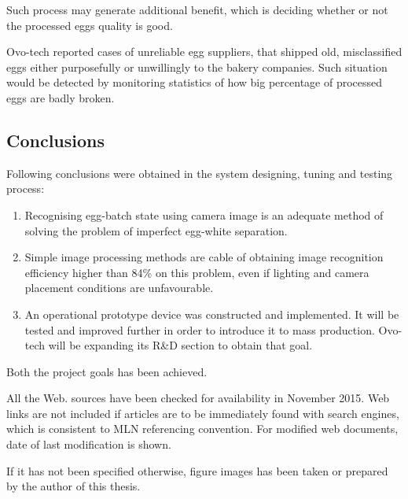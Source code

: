 \documentclass[12pt,twoside,a4paper]{article}
\begin{document}
Such process may generate additional benefit, which is deciding whether or not the processed eggs quality is good.

Ovo-tech reported cases of unreliable egg suppliers, that shipped old, misclassified eggs either purposefully or unwillingly to the bakery companies.
Such situation would be detected by monitoring statistics of how big percentage of processed eggs are badly broken.

\subsection{Conclusions}

Following conclusions were obtained in the system designing, tuning and testing process:
\begin{enumerate}
\item Recognising egg-batch state using camera image is an adequate method of solving the problem of imperfect egg-white separation.
\item Simple image processing methods are cable of obtaining image recognition efficiency higher than 84\% on this problem, even if lighting and camera placement conditions are unfavourable.
\item An operational prototype device was constructed and implemented. It will be tested and improved further in order to introduce it to mass production. Ovo-tech will be expanding its R\&D section to obtain that goal.
\end{enumerate}

Both the project goals has been achieved.

\newpage
All the Web. sources have been checked for availability in November 2015.
Web links are not included if articles are to be immediately found with search engines, which is consistent to MLN referencing convention.
For modified web documents, date of last modification is shown.

If it has not been specified otherwise, figure images has been taken or prepared by the author of this thesis.
\end{document}
